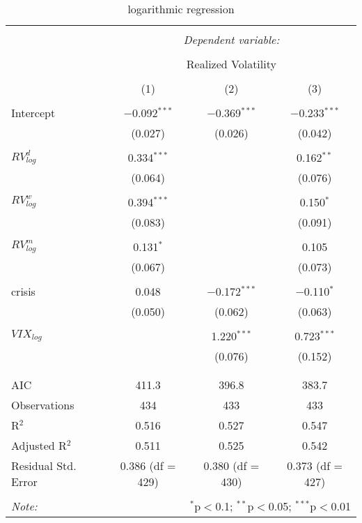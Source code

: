 
\begin{table}[!htbp] \centering 
  \caption{logarithmic regression} 
  \label{} 
\begin{tabular}{@{\extracolsep{5pt}}lccc} 
\\[-1.8ex]\hline 
\hline \\[-1.8ex] 
 & \multicolumn{3}{c}{\textit{Dependent variable:}} \\ 
\cline{2-4} 
\\[-1.8ex] & \multicolumn{3}{c}{Realized Volatility} \\ 
\\[-1.8ex] & (1) & (2) & (3)\\ 
\hline \\[-1.8ex] 
 Intercept & $-$0.092$^{***}$ & $-$0.369$^{***}$ & $-$0.233$^{***}$ \\ 
  & (0.027) & (0.026) & (0.042) \\ 
  & & & \\ 
 $RV^{d}_{log}$ & 0.334$^{***}$ &  & 0.162$^{**}$ \\ 
  & (0.064) &  & (0.076) \\ 
  & & & \\ 
 $RV^{w}_{log}$ & 0.394$^{***}$ &  & 0.150$^{*}$ \\ 
  & (0.083) &  & (0.091) \\ 
  & & & \\ 
 $RV^{m}_{log}$ & 0.131$^{*}$ &  & 0.105 \\ 
  & (0.067) &  & (0.073) \\ 
  & & & \\ 
 crisis & 0.048 & $-$0.172$^{***}$ & $-$0.110$^{*}$ \\ 
  & (0.050) & (0.062) & (0.063) \\ 
  & & & \\ 
 $VIX_{log}$ &  & 1.220$^{***}$ & 0.723$^{***}$ \\ 
  &  & (0.076) & (0.152) \\ 
  & & & \\ 
\hline \\[-1.8ex] 
AIC & 411.3 & 396.8 & 383.7 \\ 
Observations & 434 & 433 & 433 \\ 
R$^{2}$ & 0.516 & 0.527 & 0.547 \\ 
Adjusted R$^{2}$ & 0.511 & 0.525 & 0.542 \\ 
Residual Std. Error & 0.386 (df = 429) & 0.380 (df = 430) & 0.373 (df = 427) \\ 
\hline 
\hline \\[-1.8ex] 
\textit{Note:}  & \multicolumn{3}{r}{$^{*}$p$<$0.1; $^{**}$p$<$0.05; $^{***}$p$<$0.01} \\ 
\end{tabular} 
\end{table} 
